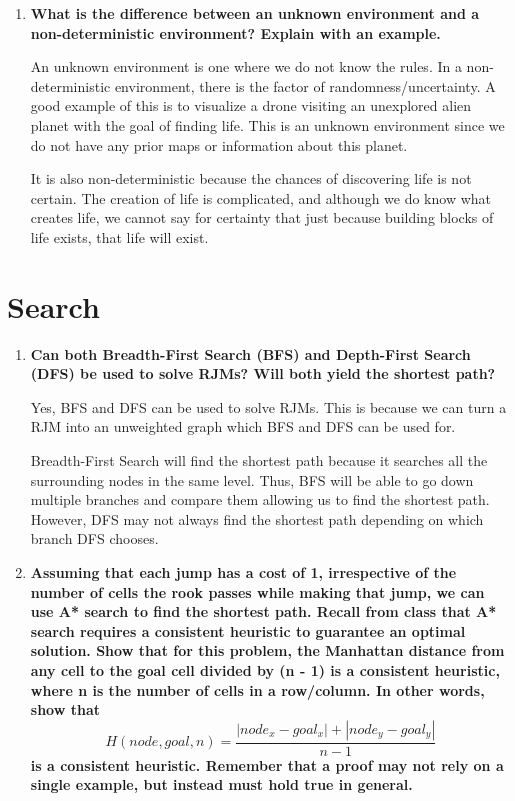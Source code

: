 \documentclass[a4paper]{article}
\begin{document}
\begin{sloppypar}
\begin{enumerate}[start=1,label=Q\arabic*,left=0pt]
    \item \textbf{What is the difference between an unknown environment and a non-deterministic environment? Explain with an example.}
    \par An unknown environment is one where we do not know the rules. In a non-deterministic environment, there is the factor of randomness/uncertainty. A good example
    of this is to visualize a drone visiting an unexplored alien planet with the goal of finding life. This is an unknown environment since we do not have any prior maps or information 
    about this planet. 
    
    It is also non-deterministic because the chances of discovering life is not certain. The creation of life is complicated,
    and although we do know what creates life, we cannot say for certainty that just because building blocks of life exists, that life will exist.

\end{enumerate}

\section{Search}

\begin{enumerate}[start=6,label=Q\arabic*,left=0pt]
    \item \textbf{Can both Breadth-First Search (BFS) and Depth-First Search (DFS) be used to solve RJMs? Will both yield the shortest path?}
    \par Yes, BFS and DFS can be used to solve RJMs. This is because we can turn a RJM into an unweighted graph which BFS and DFS 
    can be used for. 
    
    Breadth-First Search will find the shortest path because it searches all the surrounding nodes in the same level. Thus, BFS
    will be able to go down multiple branches and compare them allowing us to find the shortest path. However, DFS may not 
    always find the shortest path depending on which branch DFS chooses.

    \item \textbf{Assuming that each jump has a cost of 1, irrespective of the number of cells the rook
    passes while making that jump, we can use A* search to find the shortest path. Recall
    from class that A* search requires a consistent heuristic to guarantee an optimal solution.
    Show that for this problem, the Manhattan distance from any cell to the goal cell divided
    by (n - 1) is a consistent heuristic, where n is the number of cells in a row/column. In other words, show that}
    \[
    H(node, goal, n) = \frac{|node_x - goal_x| + |node_y - goal_y|}{n - 1}
    \]
    \textbf{is a consistent heuristic. Remember that a proof may not rely on a single example, but instead must hold true in general.}
    

\end{enumerate}
\end{sloppypar}
\end{document}

